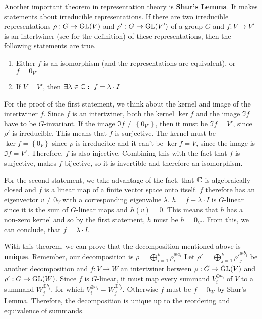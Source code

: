 Another important theorem in representation theory is \textbf{Shur's Lemma}.
It makes statements about irreducible representations.
If there are two irreducible representations $\rho: G \to \operatorname{GL}(V)$ and $\rho': G \to \operatorname{GL}(V')$ of a group $G$ and $f: V \to V'$ is an intertwiner (see  for the definition) of these representations, then the following statements are true.
\begin{enumerate}
    \item Either $f$ is an isomorphism (and the representations are equivalent), or $f = 0_{V'}$
    \item If $V = V'$, then $\exists \lambda \in \mathbb{C}:\ f = \lambda \cdot I$
\end{enumerate}
For the proof of the first statement, we think about the kernel and image of the intertwiner $f$.
Since $f$ is an intertwiner, both the kernel $\ker f$ and the image $\Im f$ have to be $G$-invariant.
If the image $\Im f \neq \left\{ 0_{V'} \right\}$, then it must be $\Im f = V'$, since $\rho'$ is irreducible.
This means that $f$ is surjective.
The kernel must be $\ker f = \left\{ 0_V \right\}$ since $\rho$ is irreducible and it can't be $\ker f = V$, since the image is $\Im f = V'$.
Therefore, $f$ is also injective.
Combining this with the fact that $f$ is surjective, makes $f$ bijective, so it is invertible and therefore an isomorphism.

For the second statement, we take advantage of the fact, that $\mathbb{C}$ is algebraically closed and $f$ is a linear map of a finite vector space onto itself.
$f$ therefore has an eigenvector $v \neq 0_V$ with a corresponding eigenvalue $\lambda$.
$h = f - \lambda \cdot I$ is $G$-linear since it is the sum of $G$-linear maps and $h(v) = 0$.
This means that $h$ has a non-zero kernel and so by the first statement, $h$ must be $h = 0_{V'}$.
From this, we can conclude, that $f = \lambda \cdot I$.

With this theorem, we can prove that the decomposition mentioned above is \textbf{unique}.
Remember, our decomposition is $\rho = \bigoplus_{i=1}^k \rho^{\oplus a_i}_i$
Let $\rho' = \bigoplus_{j=1}^k \rho'^{\oplus b_j}_j$ be another decomposition and $f: V \to W$ an intertwiner between $\rho: G \to \operatorname{GL}(V)$ and $\rho': G \to \operatorname{GL}(W)$.
Since $f$ is $G$-linear, it must map every summand $V_i^{\oplus a_i}$ of $V$ to a summand $W_j^{\oplus b_j}$, for which $V_i^{\oplus a_i} \equiv W_j^{\oplus b_j}$.
Otherwise $f$ must be $f = 0_W$ by Shur's Lemma.
Therefore, the decomposition is unique up to the reordering and equivalence of summands.
